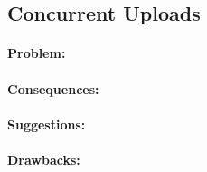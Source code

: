 \subsection{Concurrent Uploads}


\paragraph{Problem:}

\paragraph{Consequences:}

\paragraph{Suggestions:}

\paragraph{Drawbacks:}
